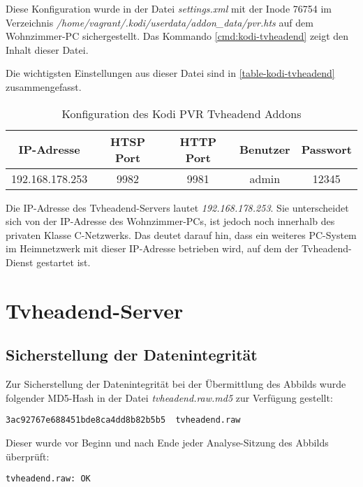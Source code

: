 Diese Konfiguration wurde in der Datei \textit{settings.xml} mit der Inode 76754 im Verzeichnis \textit{/home/vagrant/.kodi/userdata/addon\_data/pvr.hts} auf dem Wohnzimmer-PC sichergestellt. Das Kommando \autoref{cmd:kodi-tvheadend} zeigt den Inhalt dieser Datei.

Die wichtigsten Einstellungen aus dieser Datei sind in \autoref{table-kodi-tvheadend} zusammengefasst.

\begin{table}[H]
\centering
\begin{tabular}{ccccc}
\hline 
IP-Adresse & HTSP Port & HTTP Port & Benutzer & Passwort \\ 
\hline 
192.168.178.253 & 9982 & 9981 & admin & 12345 \\ 
\hline 
\end{tabular}
\caption{Konfiguration des Kodi PVR Tvheadend Addons}
\label{table-kodi-tvheadend}
\end{table}

Die IP-Adresse des Tvheadend-Servers lautet \textit{192.168.178.253}. Sie unterscheidet sich von der IP-Adresse des Wohnzimmer-PCs, ist jedoch noch innerhalb des privaten Klasse C-Netzwerks. Das deutet darauf hin, dass ein weiteres PC-System im Heimnetzwerk mit dieser IP-Adresse betrieben wird, auf dem der Tvheadend-Dienst gestartet ist.

\section{Tvheadend-Server}

\subsection{Sicherstellung der Datenintegrität}

Zur Sicherstellung der Datenintegrität bei der Übermittlung des Abbilds wurde folgender MD5-Hash in der Datei \textit{tvheadend.raw.md5} zur Verfügung gestellt:

\begin{verbatim}
3ac92767e688451bde8ca4dd8b82b5b5  tvheadend.raw
\end{verbatim}

Dieser wurde vor Beginn und nach Ende jeder Analyse-Sitzung des Abbilds überprüft:

\begin{cmd}
\begin{verbatim}
tvheadend.raw: OK
\end{verbatim}
\caption{md5sum -c tvheadend.raw.md5}
\end{cmd}

